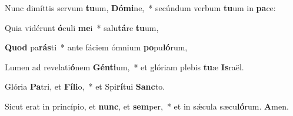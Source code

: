 \item Nunc dimíttis servum \textbf{tu}um, \textbf{Dó}\textbf{mi}ne,~* secúndum verbum \textbf{tu}um in \textbf{pa}ce:

\item Quia vidérunt \textbf{ó}culi \textbf{me}i~* salu\textbf{tá}re \textbf{tu}um,

\item \textbf{Quod} pa\textbf{rás}ti~* ante fáciem ómnium \textbf{po}pu\textbf{ló}rum,

\item Lumen ad revelati\textbf{ó}nem \textbf{Gén}\textbf{ti}um,~* et glóriam plebis \textbf{tu}æ \textbf{Is}raël.

\item Glória \textbf{Pa}tri, et \textbf{Fí}\textbf{li}o,~* et Spi\textbf{rí}tui \textbf{Sanc}to.

\item Sicut erat in princípio, et \textbf{nunc}, et \textbf{sem}per,~* et in sǽcula sæcu\textbf{ló}rum. \textbf{A}men.